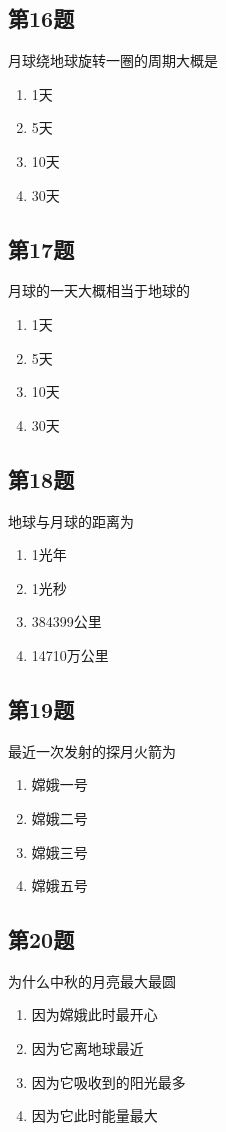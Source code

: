 \documentclass[hyperref,UTF8]{ctexart}
\begin{document}
\subsection*{第16题} 月球绕地球旋转一圈的周期大概是
\begin{enumerate}[\label= A.]
    \item 1天
    \item 5天
    \item 10天
    \item 30天
\end{enumerate}

\subsection*{第17题} 月球的一天大概相当于地球的
\begin{enumerate}[\label= A.]
    \item 1天
    \item 5天
    \item 10天
    \item 30天
\end{enumerate}

\subsection*{第18题} 地球与月球的距离为
\begin{enumerate}[\label= A.]
    \item 1光年
    \item 1光秒
    \item 384399公里
    \item 14710万公里
\end{enumerate}
\newpage
\subsection*{第19题} 最近一次发射的探月火箭为
\begin{enumerate}[\label= A.]
    \item 嫦娥一号
    \item 嫦娥二号
    \item 嫦娥三号
    \item 嫦娥五号
\end{enumerate}

\subsection*{第20题} 为什么中秋的月亮最大最圆
\begin{enumerate}[\label= A.]
    \item 因为嫦娥此时最开心
    \item 因为它离地球最近
    \item 因为它吸收到的阳光最多
    \item 因为它此时能量最大
\end{enumerate}
\end{document}
